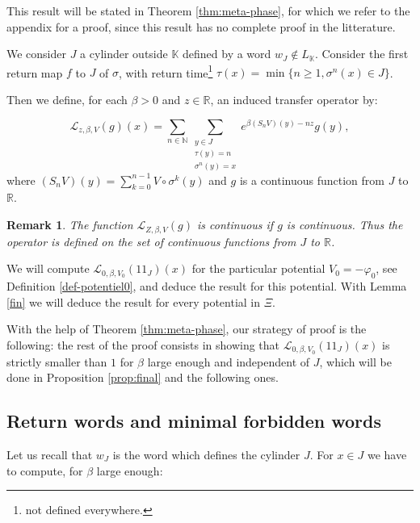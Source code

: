 \documentclass[11 pt]{article}
\newtheorem{remark}[proposition]{Remark}
\def\R{{\mathbb R}}
\newcommand {\CL}{{\mathcal L}}
\def\be{\beta}
\newcommand{\BBone}{{1\!\!1}}
\theoremstyle{definition}
\begin{document}
This result will be stated in Theorem \ref{thm:meta-phase}, for which we refer to the appendix for a proof, since this result has no complete proof in the litterature.

We consider $J$ a cylinder outside $\mathbb K$ defined by a word $w_J\notin L_{\mathbb K}$. Consider the first return map $f$ to $J$ of $\sigma$, with return time{\color{orange}\footnote{not defined everywhere.}} $\tau(x)=\min\{n\geq 1, \sigma^n(x)\in J\}$.



Then we define, for each $\beta>0$ and $z\in\mathbb R$, an induced {transfer operator} by:

\begin{equation}\label{eq-operator}
\mathcal{L}_{z,\beta,V}(g)(x)=\displaystyle\sum_{n\in\mathbb{N}}\sum_{\substack{y\in J\\ \tau(y)=n\\ \sigma^n(y)=x}}e^{\beta(S_nV)(y)-nz}g(y),
\end{equation}
where $(S_nV)(y)=\displaystyle\sum_{k=0}^{n-1}V\circ \sigma^k(y)$ and $g$ is a continuous function from $J$ to $\R$.

\begin{remark}
The function $\CL_{Z,\beta,V}(g)$ is continuous if $g$ is continuous. Thus the operator is defined on the set of continuous functions from $J$ to  $\mathbb R$.
\end{remark}


We will compute  $\mathcal{L}_{0,\beta,V_0}(\BBone_J)(x)$ for the particular potential $V_0=-\varphi_0$, see Definition \ref{def-potentiel0}, and deduce the result for this potential. With Lemma \ref{fin} we will deduce the result for every potential in $\Xi$.



With the help of Theorem \ref{thm:meta-phase}, our strategy of proof is the following: the rest of the proof consists in showing that $\CL_{0,\be,V_0}(\BBone_J)(x)$
is strictly smaller than $1$ for $\beta$ large enough and independent of $J$, which will be done in Proposition \ref{prop:final} and the following ones.  

\subsection{Return words and minimal forbidden words}
Let us recall that $w_J$ is the word which defines the cylinder $J$. For $x\in J$ we have to compute, for $\beta$ large enough: 
 
\end{document}
